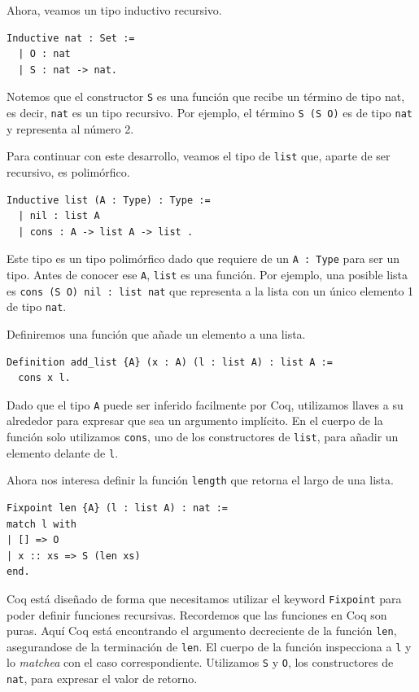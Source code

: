 Ahora, veamos un tipo inductivo recursivo.

\begin{lstlisting}
Inductive nat : Set :=
  | O : nat
  | S : nat -> nat.
\end{lstlisting}

Notemos que el constructor \lstinline{S} es una función que recibe un término de tipo {nat}, es decir, \lstinline{nat} es un tipo recursivo. Por ejemplo, el término \lstinline{S (S O)} es de tipo \lstinline{nat} y representa al número 2.

Para continuar con este desarrollo, veamos el tipo de \lstinline{list} que, aparte de ser recursivo, es polimórfico.

\begin{lstlisting}
Inductive list (A : Type) : Type :=
  | nil : list A
  | cons : A -> list A -> list .
\end{lstlisting}

Este tipo es un tipo polimórfico dado que requiere de un \lstinline{A : Type} para ser un tipo. Antes de conocer ese \lstinline{A}, \lstinline{list} es una función. Por ejemplo, una posible lista es \lstinline{cons (S O) nil : list nat} que representa a la lista con un único elemento 1 de tipo \lstinline{nat}.

Definiremos una función que añade un elemento a una lista.

\begin{lstlisting}
Definition add_list {A} (x : A) (l : list A) : list A :=
  cons x l.
\end{lstlisting}

Dado que el tipo \lstinline{A} puede ser inferido facilmente por Coq, utilizamos llaves a su alrededor para expresar que sea un argumento implícito. En el cuerpo de la función solo utilizamos \lstinline{cons}, uno de los constructores de \lstinline{list}, para añadir un elemento delante de \lstinline{l}.

Ahora nos interesa definir la función \lstinline{length} que retorna el largo de una lista.

\begin{lstlisting}
Fixpoint len {A} (l : list A) : nat :=
match l with
| [] => O
| x :: xs => S (len xs)
end.
\end{lstlisting}

Coq está diseñado de forma que necesitamos utilizar el keyword \lstinline{Fixpoint} para poder definir funciones recursivas. Recordemos que las funciones en Coq son puras. Aquí Coq está encontrando el argumento decreciente de la función \lstinline{len}, asegurandose de la terminación de \lstinline{len}.
El cuerpo de la función inspecciona a \lstinline{l} y lo \textit{matchea} con el caso correspondiente. Utilizamos \lstinline{S} y \lstinline{O}, los constructores de \lstinline{nat}, para expresar el valor de retorno.

